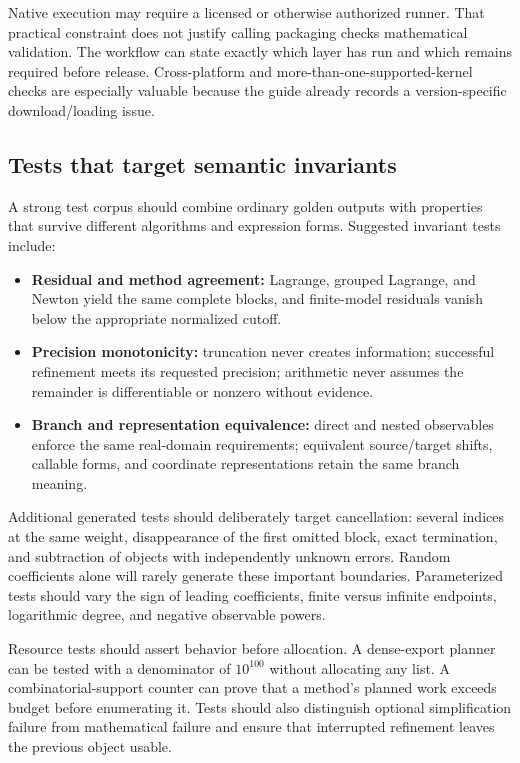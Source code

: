 \documentclass[11pt,a4paper]{article}
\theoremstyle{definition}
\begin{document}
Native execution may require a licensed or otherwise authorized runner. That practical constraint does not justify calling packaging checks mathematical validation. The workflow can state exactly which layer has run and which remains required before release. Cross-platform and more-than-one-supported-kernel checks are especially valuable because the guide already records a version-specific download/loading issue.\cite{guide}

\subsection{Tests that target semantic invariants}

A strong test corpus should combine ordinary golden outputs with properties that survive different algorithms and expression forms. Suggested invariant tests include:
\begin{itemize}
\item \textbf{Residual and method agreement:} Lagrange, grouped Lagrange, and Newton yield the same complete blocks, and finite-model residuals vanish below the appropriate normalized cutoff.
\item \textbf{Precision monotonicity:} truncation never creates information; successful refinement meets its requested precision; arithmetic never assumes the remainder is differentiable or nonzero without evidence.
\item \textbf{Branch and representation equivalence:} direct and nested observables enforce the same real-domain requirements; equivalent source/target shifts, callable forms, and coordinate representations retain the same branch meaning.
\end{itemize}

Additional generated tests should deliberately target cancellation: several indices at the same weight, disappearance of the first omitted block, exact termination, and subtraction of objects with independently unknown errors. Random coefficients alone will rarely generate these important boundaries. Parameterized tests should vary the sign of leading coefficients, finite versus infinite endpoints, logarithmic degree, and negative observable powers.

Resource tests should assert behavior before allocation. A dense-export planner can be tested with a denominator of $10^{100}$ without allocating any list. A combinatorial-support counter can prove that a method's planned work exceeds budget before enumerating it. Tests should also distinguish optional simplification failure from mathematical failure and ensure that interrupted refinement leaves the previous object usable.
\end{document}
